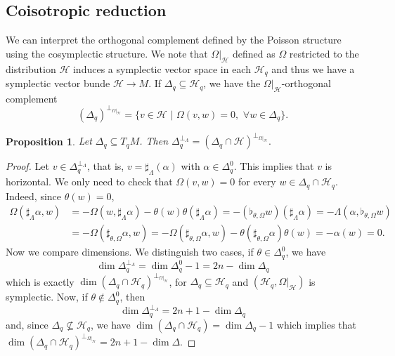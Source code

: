 \documentclass[12pt]{article}
\newtheorem{prop}{Proposition}[section]
\renewcommand{\dim}{\operatorname{dim}}
\begin{document}
\subsection{Coisotropic reduction}

We can interpret the orthogonal complement defined by the Poisson structure using the cosymplectic structure. We note that $\Omega|_\mathcal{H}$ defined as $\Omega$ restricted to the distribution $\mathcal{H}$ induces a symplectic vector space in each $\mathcal{H}_q$ and thus we have a symplectic vector bunde $\mathcal{H} \rightarrow M$. If $\Delta_q \subseteq \mathcal{H}_q$, we have the $\Omega|_\mathcal{H}$-orthogonal complement $$(\Delta_q)^{\perp_{\Omega|_\mathcal{H}}} = \{ v \in \mathcal{H} \,\, | \,\, \Omega(v,w) = 0,\,\, \forall w \in \Delta_q\}.$$

\begin{prop}\label{CosymplecticOrthognal}Let $\Delta_q \subseteq T_qM$. Then $\Delta_q^{\perp_\Lambda} = (\Delta_q\cap \mathcal{H})^{\perp_{\Omega|_{\mathcal{H}}}}.$
\end{prop}
\begin{proof} Let $v \in \Delta_q^{\perp_\Lambda}$, that is, $v = \sharp_\Lambda(\alpha)$ with $\alpha \in \Delta_q^0$. This implies that $v$ is horizontal. We only need to check that $\Omega(v,w) = 0$ for every $w \in \Delta_q \cap \mathcal{H}_q$. Indeed, since $\theta(w) = 0$,
\begin{align*} 
\Omega(\sharp_\Lambda\alpha, w) &= - \Omega(w, \sharp_\Lambda\alpha) - \theta(w)\theta(\sharp_\Lambda \alpha) = -(\flat_{\theta, \Omega}w)(\sharp_\Lambda \alpha) = - \Lambda(\alpha, \flat_{\theta, \Omega} w)  \\
&= - \Omega(\sharp_{\theta, \Omega} \alpha, w)  =  - \Omega(\sharp_{\theta, \Omega} \alpha, w)  - \theta(\sharp_{\theta, \Omega}\alpha)\theta( w) = - \alpha(w) = 0.
\end{align*}
Now we compare dimensions. We distinguish two cases, if $\theta \in \Delta_q^0$, we have $$\dim \Delta_q^{\perp_\Lambda} = \dim \Delta_q^0 - 1 = 2n - \dim \Delta_q$$ which is exactly $\dim(\Delta_q \cap \mathcal{H}_q)^{\perp_{\Omega|_\mathcal{H}}}$, for $\Delta_q \subseteq \mathcal{H}_q$ and $(\mathcal{H}_q, \Omega |_\mathcal{H})$ is symplectic. Now, if $\theta \not \in \Delta_q^0$, then $$\dim \Delta_q^{\perp_\Lambda} = 2n +1 - \dim \Delta_q$$ and, since $\Delta_q \not \subseteq \mathcal{H}_q$, we have $\dim (\Delta_q \cap \mathcal{H}_q) = \dim \Delta_q - 1$ which implies that $\dim (\Delta_q \cap \mathcal{H}_q)^{\perp_{\Omega|_\mathcal{H}}} = 2n + 1 - \dim \Delta. $
\end{proof}
\end{document}

